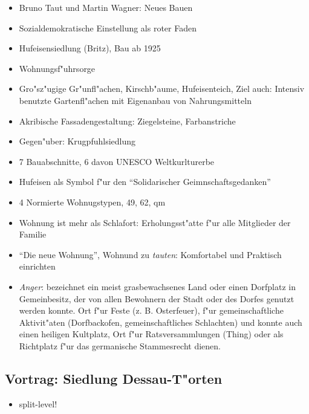 \documentclass[a5paper]{scrartcl}
\begin{document}
\begin{itemize}
  \item Bruno Taut und Martin Wagner: Neues Bauen
  \item Sozialdemokratische Einstellung als roter Faden
  \item Hufeisensiedlung (Britz), Bau ab 1925
  \item Wohnungsf"uhrsorge
  \item Gro"sz"ugige Gr"unfl"achen, Kirschb"aume, Hufeisenteich, Ziel auch: Intensiv benutzte Gartenfl"achen mit Eigenanbau von Nahrungsmitteln
  \item Akribische Fassadengestaltung: Ziegelsteine, Farbanstriche
  \item Gegen"uber: Krugpfuhlsiedlung
  \item 7 Bauabschnitte, 6 davon UNESCO Weltkurlturerbe
  \item Hufeisen als Symbol f"ur den "`Solidarischer Geimnschaftsgedanken"'
  \item 4 Normierte Wohnugstypen, 49, 62, qm
  \item Wohnung ist mehr als Schlafort: Erholungsst"atte f"ur alle Mitglieder der Familie
  \item "`Die neue Wohnung"', Wohnund zu \emph{tauten}: Komfortabel und Praktisch einrichten
  \item \emph{Anger}: bezeichnet ein meist grasbewachsenes Land oder einen Dorfplatz in Gemeinbesitz, der von allen Bewohnern der Stadt oder des Dorfes genutzt werden konnte.  Ort f"ur Feste (z. B. Osterfeuer), f"ur gemeinschaftliche Aktivit"aten (Dorfbackofen, gemeinschaftliches Schlachten) und konnte auch einen heiligen Kultplatz, Ort f"ur Ratsversammlungen (Thing) oder als Richtplatz f"ur das germanische Stammesrecht dienen. 
\end{itemize}


\subsection{Vortrag: Siedlung Dessau-T"orten}

\begin{itemize}
  \item split-level!
\end{itemize}
\end{document}
